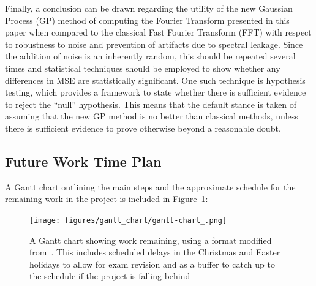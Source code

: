\documentclass[12pt]{article}
\begin{document}
    Finally, a conclusion can be drawn regarding the utility of the new Gaussian Process (GP) method of computing the Fourier Transform presented in this paper when compared to the classical Fast Fourier Transform (FFT) with respect to robustness to noise and prevention of artifacts due to spectral leakage.
    Since the addition of noise is an inherently random, this should be repeated several times and statistical techniques should be employed to show whether any differences in MSE are statistically significant.
    One such technique is hypothesis testing, which provides a framework to state whether there is sufficient evidence to reject the ``null'' hypothesis.
    This means that the default stance is taken of assuming that the new GP method is no better than classical methods, unless there is sufficient evidence to prove otherwise beyond a reasonable doubt.

    \subsection{Future Work Time Plan}
    A Gantt chart outlining the main steps and the approximate schedule for the remaining work in the project is included in Figure~\ref{fig:gantt-chart_}:

    \begin{landscape}
        \begin{figure}[p] %
            \centering
            \texttt{[image: figures/gantt\_chart/gantt-chart\_.png]}
            \caption{A Gantt chart showing work remaining, using a format modified from~\cite{DataCampGanttChart2021}. This includes scheduled delays in the Christmas and Easter holidays to allow for exam revision and as a buffer to catch up to the schedule if the project is falling behind}
            \label{fig:gantt-chart_}
        \end{figure}
    \end{landscape}

%    

    \printbibliography
\end{document}
